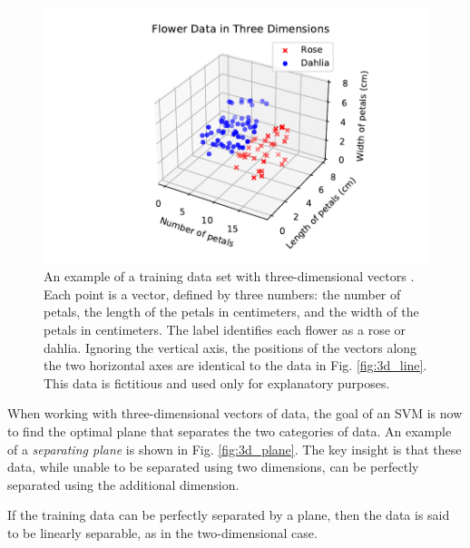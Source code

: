 \documentclass[%
 reprint,
nofootinbib,
 amsmath,amssymb,
 aps,
]{revtex4-2}
\begin{document}
\begin{figure}
    \includegraphics[width=\linewidth]{Figures/3d_noplane.pdf}
    \caption{\label{fig:3d_noplane}An example of a training data set with three-dimensional vectors \cite{noauthor_all_nodate}. Each point is a vector, defined by three numbers: the number of petals, the length of the petals in centimeters, and the width of the petals in centimeters. The label identifies each flower as a rose or dahlia. Ignoring the vertical axis, the positions of the vectors along the two horizontal axes are identical to the data in Fig. \ref{fig:3d_line}. This data is fictitious and used only for explanatory purposes.}
\end{figure}

When working with three-dimensional vectors of data, the goal of an SVM is now to find the optimal plane that separates the two categories of data. An example of a \textit{separating plane} is shown in Fig. \ref{fig:3d_plane}. The key insight is that these data, while unable to be separated using two dimensions, can be perfectly separated using the additional dimension.

If the training data can be perfectly separated by a plane, then the data is said to be linearly separable, as in the two-dimensional case.
\end{document}
